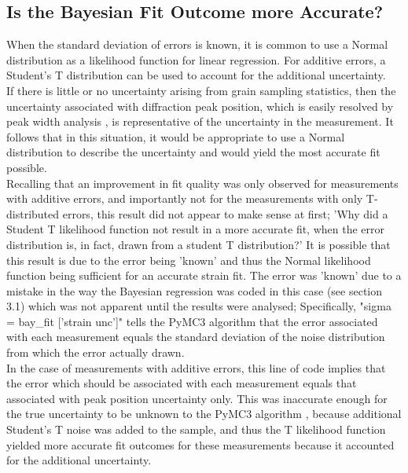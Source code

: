 \subsection{Is the Bayesian Fit Outcome more Accurate?}
\label{subsec:subsec01}

When the standard deviation of errors is known, it is common to use a Normal distribution as a likelihood function for linear regression. For additive errors, a Student's T distribution can be used to account for the additional uncertainty. \cite{zhu_2018_bayesian}\\

If there is little or no uncertainty arising from grain sampling statistics, then the uncertainty associated with diffraction peak position, which is easily resolved by peak width analysis \cite{zhu_2018_bayesian}, is representative of the uncertainty in the measurement. It follows that in this situation, it would be appropriate to use a Normal distribution to describe the uncertainty and would yield the most accurate fit possible.\\ 

Recalling that an improvement in fit quality was only observed for measurements with additive errors, and importantly not for the measurements with only T-distributed errors, this result did not appear to make sense at first; 'Why did a Student T likelihood function not result in a more accurate fit, when the error distribution is, in fact, drawn from a student T distribution?' It is possible that this result is due to the error being 'known' and thus the Normal likelihood function being sufficient for an accurate strain fit. The error was 'known' due to a mistake in the way the Bayesian regression was coded in this case (see section 3.1) which was not apparent until the results were analysed; Specifically, "sigma = bay\_fit ['strain unc']" tells the PyMC3 algorithm that the error associated with each measurement equals the standard deviation of the noise distribution from which the error actually drawn. \\

In the case of measurements with additive errors, this line of code implies that the error which should be associated with each measurement equals that associated with peak position uncertainty only. This was inaccurate enough for the true uncertainty to be unknown to the PyMC3 algorithm , because additional Student's T noise was added to the sample, and thus the T likelihood function yielded more accurate fit outcomes for these measurements because it accounted for the additional uncertainty. \\

